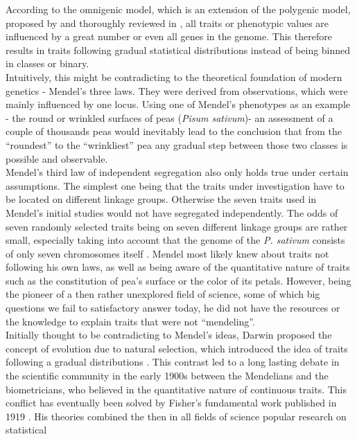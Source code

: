 According to the omnigenic model, which is an extension of the polygenic model, proposed
by \cite{boyle2017expanded} and thoroughly reviewed in \cite{timpson2018}, all traits or
phenotypic values are influenced by a great number or even all genes in the genome. This
therefore results in traits following gradual statistical distributions instead of being
binned in classes or
binary.\\
Intuitively, this might be contradicting to the theoretical foundation of modern genetics -
Mendel's three laws. They were derived from observations, which were mainly influenced by
one locus. Using one of Mendel's phenotypes as an example - the round or wrinkled surfaces
of peas (\textit{Pisum sativum})- an assessment of a couple of thousands peas would
inevitably lead to the conclusion that from the ``roundest'' to the ``wrinkliest'' pea any
gradual step between those two classes is
possible and observable. \\
Mendel's third law of independent segregation also only holds true under certain
assumptions. The simplest one being that the traits under investigation have to be
located on different linkage groups. Otherwise the seven traits used in Mendel's initial
studies would not have segregated independently. The odds of seven randomly selected
traits being on seven different linkage groups are rather small, especially taking into
account that the genome of the \textit{P. sativum} consists of only seven chromosomes itself
\cite{kalo2004}. Mendel most likely knew about traits not following his own laws, as well
as being aware of the quantitative nature of traits such as the constitution of pea's
surface or the color of its petals. However, being the pioneer of a then rather unexplored
field of science, some of which big questions we fail to satisfactory answer today, he did
not have
the resources or the knowledge to explain traits that were not ``mendeling''. \\
Initially thought to be contradicting to Mendel's ideas, Darwin proposed the concept of
evolution due to natural selection, which introduced the idea of traits following a
gradual distributions \cite{darwin1859}. This contrast led to a long lasting debate in the
scientific community in the early 1900s between the Mendelians and the biometricians, who
believed in the quantitative nature of continuous traits. This conflict has eventually
been solved by Fisher's fundamental work published in 1919 \cite{fisher1919xv}. His
theories combined the then in all fields of science popular research on statistical
